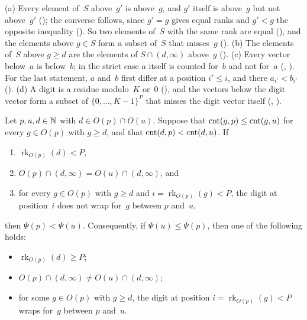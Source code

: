 \begin{outline}
(a) Every element of~$S$ above~$g'$ is above~$g$, and $g'$ itself is above~$g$ but not above~$g'$ ();
the converse follows, since $g'=g$ gives equal ranks and $g'<g$ the opposite inequality (). So two elements
of~$S$ with the same
rank are equal (), and the elements above $g\in S$ form a subset of~$S$ that misses~$g$
(). (b) The elements of~$S$ above $g\ge d$ are the elements of $S\cap(d,\infty)$ above~$g$
(). (c) Every vector below~$a$ is below~$b$; in the strict case $a$ itself is counted for~$b$ and not
for~$a$ (, ). For the last statement, $a$ and~$b$ first differ at a position
$i'\le i$, and there $a_{i'}<b_{i'}$ (). (d) A digit is a residue modulo~$K$ or~$0$
(), and the vectors below the digit vector form a subset of $\{0,\dots,K-1\}^P$ that misses the digit vector itself
(, ).
\end{outline}

\begin{lemma}[Lemma V]\label{lem:V}
Let $p,u,d\in\mathbb{N}$ with $d\in O(p)\cap O(u)$. Suppose that $\mathrm{cnt}(g,p)\le\mathrm{cnt}(g,u)$ for every $g\in O(p)$ with $g\ge d$, and that
$\mathrm{cnt}(d,p)<\mathrm{cnt}(d,u)$. If
\begin{enumerate}[label=(\roman*)]
\item $\operatorname{rk}_{O(p)}(d)<P$,
\item $O(p)\cap(d,\infty)=O(u)\cap(d,\infty)$, and
\item for every $g\in O(p)$ with $g\ge d$ and $i=\operatorname{rk}_{O(p)}(g)<P$, the digit at position~$i$ does not wrap for~$g$
between $p$ and~$u$,
\end{enumerate}
then $\Psi(p)<\Psi(u)$. Consequently, if $\Psi(u)\le\Psi(p)$, then one of the following holds:
\begin{itemize}[leftmargin=4.5em]
\item[\textup{(TRUNC)}] $\operatorname{rk}_{O(p)}(d)\ge P$;
\item[\textup{(ABOVE)}] $O(p)\cap(d,\infty)\ne O(u)\cap(d,\infty)$;
\item[\textup{(WRAP)}] for some $g\in O(p)$ with $g\ge d$, the digit at position $i=\operatorname{rk}_{O(p)}(g)<P$ wraps for~$g$ between
$p$ and~$u$.
\end{itemize}
\end{lemma}


